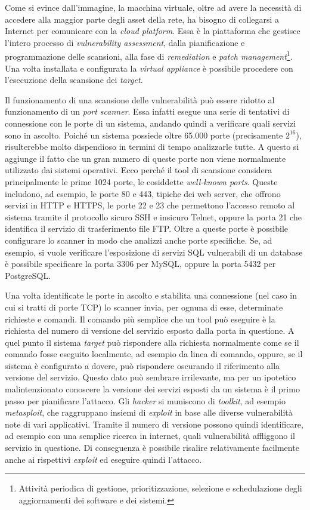 \documentclass[target=bach,aauheader=]{thud}
\begin{document}
Come si evince dall’immagine, la macchina virtuale, oltre ad avere la necessità di accedere alla maggior parte degli asset della rete, ha bisogno di collegarsi a Internet per comunicare con la \textit{cloud platform}. Essa è la piattaforma che gestisce l’intero processo di \textit{vulnerability assessment}, dalla pianificazione e programmazione delle scansioni, alla fase di \textit{remediation} e \textit{patch management}\footnote{Attività periodica di gestione, prioritizzazione, selezione e schedulazione degli aggiornamenti dei software e dei sistemi.}. Una volta installata e configurata la \textit{virtual appliance} è possibile procedere con l’esecuzione della scansione dei \textit{target}.

Il funzionamento di una scansione delle vulnerabilità può essere ridotto al funzionamento di un \textit{port scanner}. Essa infatti esegue una serie di tentativi di connessione con le porte di un sistema, andando quindi a verificare quali servizi sono in ascolto. Poiché un sistema possiede oltre 65.000 porte (precisamente \(2^{16}\)), risulterebbe molto dispendioso in termini di tempo analizzarle tutte. A questo si aggiunge il fatto che un gran numero di queste porte non viene normalmente utilizzato dai sistemi operativi. Ecco perché il tool di scansione considera principalmente le prime 1024 porte, le cosiddette \textit{well-known ports}. Queste includono, ad esempio, le porte 80 e 443, tipiche dei web server, che offrono servizi in HTTP e HTTPS, le porte 22 e 23 che permettono l’accesso remoto al sistema tramite il protocollo sicuro SSH e insicuro Telnet, oppure la porta 21 che identifica il servizio di trasferimento file FTP. Oltre a queste porte è possibile configurare lo scanner in modo che analizzi anche porte specifiche. Se, ad esempio, si vuole verificare l’esposizione di servizi SQL vulnerabili di un database è possibile specificare la porta 3306 per MySQL, oppure la porta 5432 per PostgreSQL.

Una volta identificate le porte in ascolto e stabilita una connessione (nel caso in cui si tratti di porte TCP) lo scanner invia, per ognuna di esse, determinate richieste e comandi. Il comando più semplice che un tool può eseguire è la richiesta del numero di versione del servizio esposto dalla porta in questione. A quel punto il sistema \textit{target} può rispondere alla richiesta normalmente come se il comando fosse eseguito localmente, ad esempio da linea di comando, oppure, se il sistema è configurato a dovere, può rispondere oscurando il riferimento alla versione del servizio. Questo dato può sembrare irrilevante, ma per un ipotetico malintenzionato conoscere la versione dei servizi esposti da un sistema è il primo passo per pianificare l’attacco. Gli \textit{hacker} si muniscono di \textit{toolkit}, ad esempio \textit{metasploit}, che raggruppano insiemi di \textit{exploit} in base alle diverse vulnerabilità note di vari applicativi. Tramite il numero di versione possono quindi identificare, ad esempio con una semplice ricerca in internet, quali vulnerabilità affliggono il servizio in questione. Di conseguenza è possibile risalire relativamente facilmente anche ai rispettivi \textit{exploit} ed eseguire quindi l’attacco.
\end{document}
